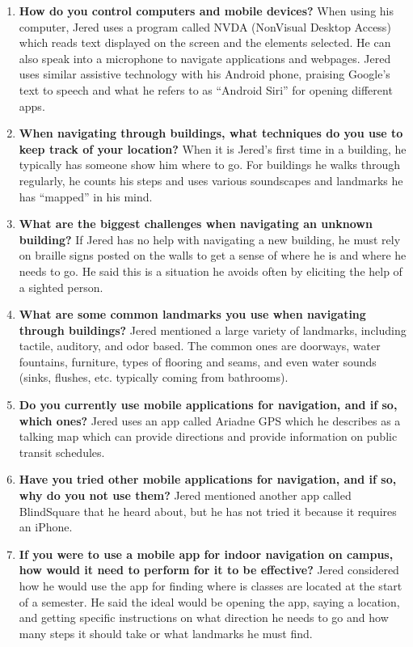 \documentclass{scrreprt}
\begin{document}
\begin{enumerate}
\item \textbf{How do you control computers and mobile devices?}
When using his computer, Jered uses a program called NVDA (NonVisual Desktop Access) which reads text displayed on the screen and the elements selected. He can also speak into a microphone to navigate applications and webpages. Jered uses similar assistive technology with his Android phone, praising Google’s text to speech and what he refers to as “Android Siri” for opening different apps.
 
\item \textbf{When navigating through buildings, what techniques do you use to keep track of your location?}
When it is Jered’s first time in a building, he typically has someone show him where to go. For buildings he walks through regularly, he counts his steps and uses various soundscapes and landmarks he has “mapped” in his mind.
 
\item \textbf{What are the biggest challenges when navigating an unknown building?}
If Jered has no help with navigating a new building, he must rely on braille signs posted on the walls to get a sense of where he is and where he needs to go. He said this is a situation he avoids often by eliciting the help of a sighted person.
 
\item \textbf{What are some common landmarks you use when navigating through buildings?}
Jered mentioned a large variety of landmarks, including tactile, auditory, and odor based. The common ones are doorways, water fountains, furniture, types of flooring and seams, and even water sounds (sinks, flushes, etc. typically coming from bathrooms).
 
\item \textbf{Do you currently use mobile applications for navigation, and if so, which ones?}
Jered uses an app called Ariadne GPS which he describes as a talking map which can provide directions and provide information on public transit schedules.
 
\item \textbf{Have you tried other mobile applications for navigation, and if so, why do you not use them?}
Jered mentioned another app called BlindSquare that he heard about, but he has not tried it because it requires an iPhone.
 
\item \textbf{If you were to use a mobile app for indoor navigation on campus, how would it need to perform for it to be effective?}
Jered considered how he would use the app for finding where is classes are located at the start of a semester. He said the ideal would be opening the app, saying a location, and getting specific instructions on what direction he needs to go and how many steps it should take or what landmarks he must find.
 

\end{enumerate}
\end{document}
